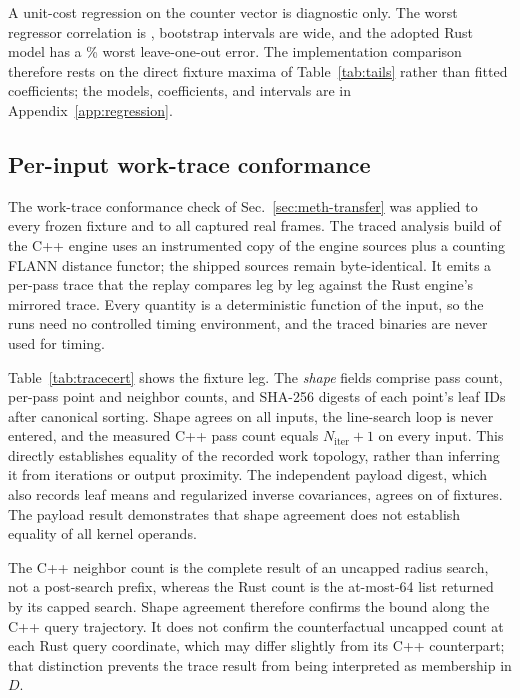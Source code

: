 A unit-cost regression on the counter vector is diagnostic only. The worst regressor
correlation is \regCorr, bootstrap intervals are wide, and the adopted Rust model has a
\regLooMaxRust\% worst leave-one-out error. The implementation comparison therefore rests on the
direct fixture maxima of Table~\ref{tab:tails} rather than fitted coefficients; the models,
coefficients, and intervals are in Appendix~\ref{app:regression}.

\subsection{Per-input work-trace conformance}
\label{sec:eval-tracecert}


The work-trace conformance check of Sec.~\ref{sec:meth-transfer} was applied to every
frozen fixture and to all \realFrames{} captured real frames. The traced analysis build of
the C++ engine uses an instrumented copy of the engine sources plus a counting FLANN
distance functor; the shipped sources remain byte-identical. It emits a per-pass trace that
the replay compares leg by leg against the Rust engine's mirrored trace. Every quantity is
a deterministic function of the input, so the runs need no controlled timing environment,
and the traced binaries are never used for timing.

Table~\ref{tab:tracecert} shows the fixture leg. The \emph{shape} fields comprise pass
count, per-pass point and neighbor counts, and SHA-256 digests of each point's leaf IDs
after canonical sorting. Shape agrees on all \traceFixtures{} inputs, the line-search loop
is never entered, and the measured C++ pass count equals $N_{\mathrm{iter}}{+}1$ on every
input. This directly establishes equality of the recorded work topology, rather than
inferring it from iterations or output proximity. The independent payload digest, which
also records leaf means and regularized inverse covariances, agrees on
\tracePayloadExactFixtures{} of \traceFixtures{} fixtures. The payload result demonstrates
that shape agreement does not establish equality of all kernel operands.

The C++ neighbor count is the complete result of an uncapped radius search, not a
post-search prefix, whereas the Rust count is the at-most-64 list returned by its capped
search. Shape agreement therefore confirms the bound along the C++ query trajectory.
It does not confirm the counterfactual uncapped count at each Rust query coordinate, which
may differ slightly from its C++ counterpart; that distinction prevents the trace result
from being interpreted as membership in $D$.

